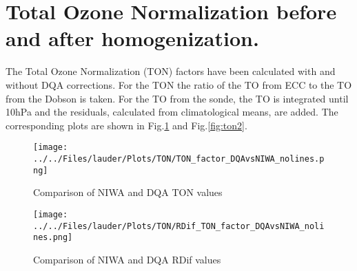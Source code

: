 %
%
%
%
%
\section{Total Ozone Normalization before and after homogenization.}

The Total Ozone Normalization (TON) factors have been calculated with and without DQA corrections. For the TON the ratio of the
TO from ECC to the TO from the Dobson is taken. For the TO from the sonde, the TO is integrated until 10hPa and the residuals, calculated from
climatological means, are added. The corresponding plots are shown in Fig.\ref{fig:ton1} and  Fig.\ref{fig:ton2}.

                                                \begin{figure}
        \centering
\texttt{[image: ../../Files/lauder/Plots/TON/TON\_factor\_DQAvsNIWA\_nolines.png]}
    \caption{Comparison of NIWA and DQA TON values}
            \label{fig:ton1}
    \end{figure}

                                                \begin{figure}
        \centering
\texttt{[image: ../../Files/lauder/Plots/TON/RDif\_TON\_factor\_DQAvsNIWA\_nolines.png]}
    \caption{Comparison of NIWA and DQA RDif values}
            \label{fig:ton3}
    \end{figure}

